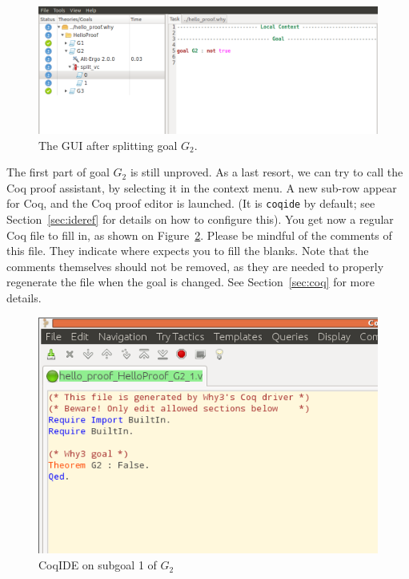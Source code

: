 \begin{figure}[tbp]
 \includegraphics[width=\textwidth]{gui-4.png}
  \caption{The GUI after splitting goal $G_2$.}
  \label{fig:gui4}
\end{figure}

The first part of goal $G_2$ is still unproved. As a last resort, we
can try to call the Coq proof assistant, by selecting it in the
context menu.
A new sub-row appear for Coq, and the Coq proof editor is launched.
(It is \texttt{coqide} by default; see
Section~\ref{sec:ideref} for details on how to configure this). You get
now a regular Coq file to fill in, as shown on Figure~\ref{fig:coqide}.
Please be mindful of the comments of this file. They indicate where \why
expects you to fill the blanks. Note that the comments themselves should
not be removed, as they are needed to properly regenerate the file when the
goal is changed. See Section~\ref{sec:coq} for more details.

\begin{figure}[tbp]
  \includegraphics[width=\textwidth]{coqide-0-81.png}
  \caption{CoqIDE on subgoal 1 of $G_2$}
  \label{fig:coqide}
\end{figure}

